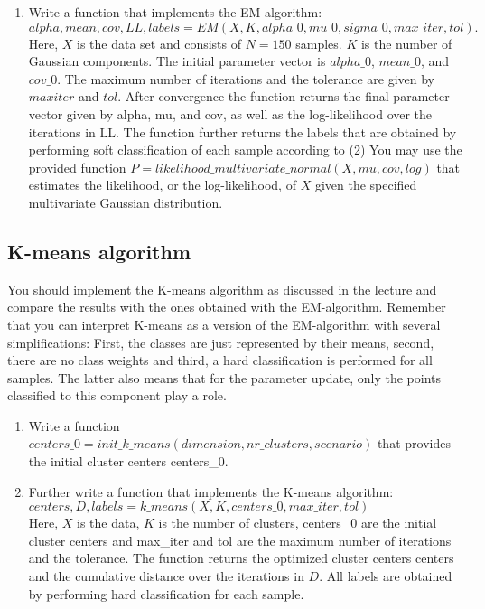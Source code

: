 \documentclass[a4paper]{article}
\begin{document}
\begin{enumerate}
\item Write a function that implements the EM algorithm: \\
$alpha, mean, cov, LL, labels = EM(X, K, alpha\_0, mu\_0, sigma\_0, max\_iter, tol).$\\
Here, $X$ is the data set and consists of $N = 150$ samples. $K$ is the number of Gaussian components. The initial parameter vector is $alpha\_0$, $mean\_0$, and $cov\_0$. The maximum number of iterations and the tolerance are given by $max iter$ and $tol$. After convergence the function returns the final parameter vector given by alpha, mu, and cov, as well as the log-likelihood over the iterations in LL. The function further returns the labels that
are obtained by performing soft classification of each sample according to (2)
\newline
You may use the provided function $P = likelihood\_multivariate\_normal(X,mu,cov,log)$ that estimates the likelihood, or the log-likelihood, of $X$ given the specified multivariate Gaussian distribution.
\end{enumerate}

\subsection{K-means algorithm}
You should implement the K-means algorithm as discussed in the lecture and compare the results with the ones obtained with the EM-algorithm. Remember that you can interpret K-means as a version of the EM-algorithm with several simplifications: First, the classes are just represented by their means, second, there are no class weights and third, a hard classification is performed for all samples. The latter also means that for the parameter update, only the points classified to this component play a role.
\begin{enumerate}
\item  Write a function $centers\_0 = init\_k\_means(dimension, nr\_clusters, scenario)$ that provides the initial cluster centers centers\_0.
\item Further write a function that implements the K-means algorithm: $centers, D, labels = k\_means(X, K, centers\_0, max\_iter, tol)$\\
Here, $X$ is the data, $K$ is the number of clusters, centers\_0 are the initial cluster centers and max\_iter and tol are the maximum number of iterations and the tolerance. The function returns the optimized cluster centers centers and the cumulative distance over the iterations in $D$. All labels are obtained by performing hard classification for each sample.
\end{enumerate}
\end{document}

